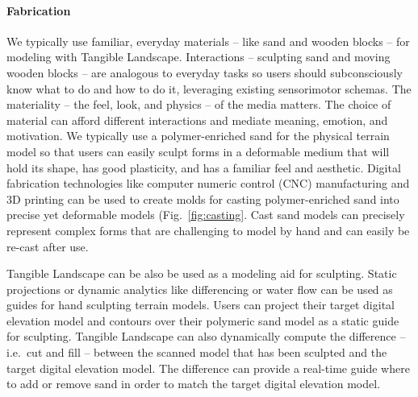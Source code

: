 \documentclass[prodmode,acmtochi]{acmsmall} %
\begin{document}
\paragraph{Fabrication}
We typically use familiar, everyday materials 
-- like sand and wooden blocks -- 
for modeling with Tangible Landscape. 
%
Interactions -- sculpting sand and moving wooden blocks -- 
are analogous to everyday tasks
so users should subconsciously know what to do and how to do it, 
leveraging existing sensorimotor schemas. 
%
The materiality -- the feel, look, and physics -- of the media matters. 
The choice of material can afford different interactions
and mediate meaning, emotion, and motivation. 
%
We typically use a polymer-enriched sand for the physical terrain model
so that users can easily sculpt forms in a deformable medium 
that will hold its shape, has good plasticity, and has a familiar feel and aesthetic. 
%
%
Digital fabrication technologies 
like computer numeric control (CNC) manufacturing and 3D printing
can be used to create molds for casting polymer-enriched sand 
into precise yet deformable models (Fig.~\ref{fig:casting}. 
%
Cast sand models can precisely represent complex forms 
that are challenging to model by hand 
and can easily be re-cast after use.

Tangible Landscape can be also be used as a modeling aid for sculpting.
%
Static projections or dynamic analytics like differencing or water flow 
can be used as guides for hand sculpting terrain models. 
%
Users can project their target digital elevation model and contours 
over their polymeric sand model as a static guide for sculpting. 
%
Tangible Landscape can also dynamically compute the difference -- i.e.\ cut and fill --
between the scanned model that has been sculpted and the target digital elevation model. 
%
The difference can provide a real-time guide 
where to add or remove sand in order to match the target digital elevation model. 
%
\end{document}

